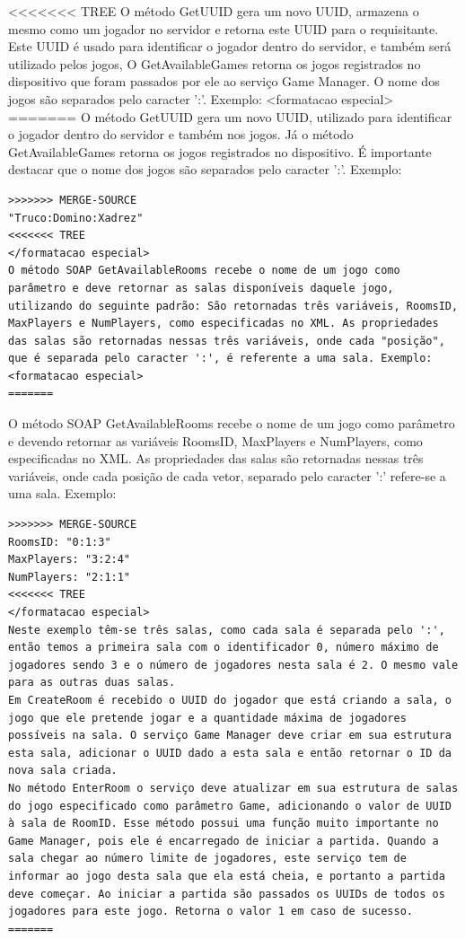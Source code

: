 \documentclass[a4paper]{sbgames}               %
\begin{document}
<<<<<<< TREE
O método GetUUID gera um novo UUID, armazena o mesmo como um jogador no servidor e retorna este UUID para o requisitante. Este UUID é usado para identificar o jogador dentro do servidor, e também será utilizado pelos jogos,
O GetAvailableGames retorna os jogos registrados no dispositivo que foram passados por ele ao serviço Game Manager. O nome dos jogos são separados pelo caracter ':'. Exemplo:
<formatacao especial>
=======
O método GetUUID gera um novo UUID, utilizado para identificar o jogador dentro do servidor e também nos jogos. Já o método GetAvailableGames retorna os jogos registrados no dispositivo. É importante destacar que o nome dos jogos são separados pelo caracter ':'. Exemplo:

\begin{verbatim}
>>>>>>> MERGE-SOURCE
"Truco:Domino:Xadrez"
<<<<<<< TREE
</formatacao especial>
O método SOAP GetAvailableRooms recebe o nome de um jogo como parâmetro e deve retornar as salas disponíveis daquele jogo, utilizando do seguinte padrão: São retornadas três variáveis, RoomsID, MaxPlayers e NumPlayers, como especificadas no XML. As propriedades das salas são retornadas nessas três variáveis, onde cada "posição", que é separada pelo caracter ':', é referente a uma sala. Exemplo:
<formatacao especial>
=======
\end{verbatim}

O método SOAP GetAvailableRooms recebe o nome de um jogo como parâmetro e devendo retornar as variáveis RoomsID, MaxPlayers e NumPlayers, como especificadas no XML. As propriedades das salas são retornadas nessas três variáveis, onde cada posição de cada vetor, separado pelo caracter ':' refere-se a uma sala. Exemplo:

\begin{verbatim}
>>>>>>> MERGE-SOURCE
RoomsID: "0:1:3"
MaxPlayers: "3:2:4"
NumPlayers: "2:1:1"
<<<<<<< TREE
</formatacao especial>
Neste exemplo têm-se três salas, como cada sala é separada pelo ':', então temos a primeira sala com o identificador 0, número máximo de jogadores sendo 3 e o número de jogadores nesta sala é 2. O mesmo vale para as outras duas salas.
Em CreateRoom é recebido o UUID do jogador que está criando a sala, o jogo que ele pretende jogar e a quantidade máxima de jogadores possíveis na sala. O serviço Game Manager deve criar em sua estrutura esta sala, adicionar o UUID dado a esta sala e então retornar o ID da nova sala criada.
No método EnterRoom o serviço deve atualizar em sua estrutura de salas do jogo especificado como parâmetro Game, adicionando o valor de UUID à sala de RoomID. Esse método possui uma função muito importante no Game Manager, pois ele é encarregado de iniciar a partida. Quando a sala chegar ao número limite de jogadores, este serviço tem de informar ao jogo desta sala que ela está cheia, e portanto a partida deve começar. Ao iniciar a partida são passados os UUIDs de todos os jogadores para este jogo. Retorna o valor 1 em caso de sucesso.
=======
\end{verbatim}
\end{document}
